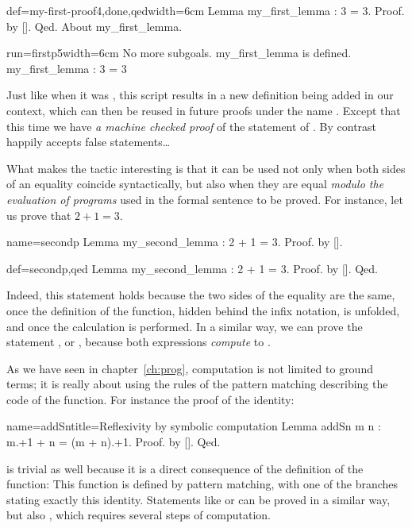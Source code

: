 \begin{coq}{def=my-first-proof4,done,qed}{width=6cm}
Lemma my_first_lemma : 3 = 3.
Proof. by []. Qed.
About my_first_lemma.
\end{coq}
\begin{coqout}{run=firstp5}{width=6cm}
No more subgoals.
my_first_lemma is defined.
my_first_lemma : 3 = 3
\end{coqout}

Just like when it was , this script results in a new definition
being
added in our context, which can then be reused in future proofs under
the name .
Except that this time we have \emph{a machine checked proof} of
the statement of .  By contrast
 happily accepts false statements\dots
{}

What makes the   tactic interesting is that it
can be used not only when both
sides of an equality coincide syntactically, but also when they are
equal \emph{modulo the evaluation of programs} used in the formal
sentence to be proved.
For instance, let us prove that $2 + 1 = 3$.

\begin{coqdef}{name=secondp}
Lemma my_second_lemma : 2 + 1 = 3.
Proof. by [].
\end{coqdef}
\begin{coq}{def=secondp,qed}{}
Lemma my_second_lemma : 2 + 1 = 3.
Proof. by []. Qed.
\end{coq}

Indeed, this statement holds because the two sides of the equality
are the same, once the definition of the  function, hidden
behind the infix \C{+} notation, is unfolded, and once the calculation
is performed. In a similar way, we can prove the statement
, or , because both expressions \emph{compute} to
.

As we have seen in chapter~\ref{ch:prog}, computation is not limited
to ground terms; it is really about using the rules of the pattern
matching describing the code of the function. For instance the proof
of the  identity:

\begin{coq}{name=addSn}{title=Reflexivity by symbolic computation}
Lemma addSn m n : m.+1 + n = (m + n).+1. Proof. by []. Qed.
\end{coq}
is trivial as well because it is a direct consequence of the
definition of the  function: This function is defined by
pattern matching, with one of the branches stating exactly this
identity. Statements like
 or  can be proved in a similar way, but
also , which requires several steps of computation.

